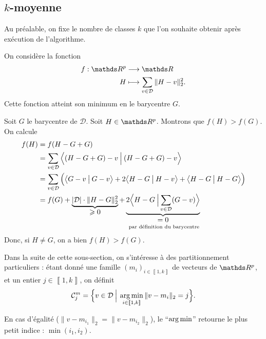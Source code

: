 \subsection{$k$-moyenne}

Au préalable, on fixe le nombre de classes $k$\/ que l'on souhaite obtenir après exécution de l'algorithme.

\begin{prop}
	On considère la fonction \begin{align*}
		f: \R^p &\longrightarrow \R \\
		H &\longmapsto \sum_{v \in \mathcal{D}} \|H - v\|_2^2.
	\end{align*}
	Cette fonction atteint son minimum en le barycentre $G$.
\end{prop}

\begin{prv}
	Soit $G$\/ le barycentre de $\mathcal{D}$. Soit $H \in \R^p$. Montrons que $f(H) > f(G)$. On calcule
	\begin{align*}
		f(H) &= f(H - G + G) \\
		&= \sum_{v \in \mathcal{D}} \Big<(H - G + G) - v \:\Big|\: (H - G + G) - v \Big> \\
		&= \sum_{v\in \mathcal{D}} \Big(\big<G - v  \:\big|\: G - v \big> + 2 \big<H - G  \:\big|\: H - v \big> + \big< H - G  \:\big|\: H - G \big>\Big) \\
		&= f(G) + \underbrace{|\mathcal{D}| \cdot \|H - G\|_2^2}_{\displaystyle\geqslant 0} + \underbrace{2 \Big<H - G\:\Big|\sum_{v \in \mathcal{D}} (G - v)\Big>}_{\substack{\displaystyle= 0\\[1mm]\text{ par définition du barycentre}}} \\
	\end{align*}
	Donc, si $H \neq G$, on a bien $f(H) > f(G)$.
\end{prv}

Dans la suite de cette sous-section, on s'intéresse à des partitionnement particuliers : étant donné une famille $(m_i)_{i\in\left\llbracket 1,k \right\rrbracket}$ de vecteurs de $\R^p$, et un entier $j \in \left\llbracket 1,k \right\rrbracket$, on définit \[
	\mathcal{C}^m_j = \Big\{v \in \mathcal{D} \:\Big|\: \operatorname*{arg\,min}_{i \in \left\llbracket 1,k \right\rrbracket} \|v-m_i\|_2 = j \Big\}
.\]

\begin{rmk}
	En cas d'égalité ($\|v - m_{i_1}\|_2 = \|v - m_{i_2}\|_2$), le ``$\operatorname*{arg\,min}$'' retourne le plus petit indice : $\min(i_1, i_2)$.
\end{rmk}

